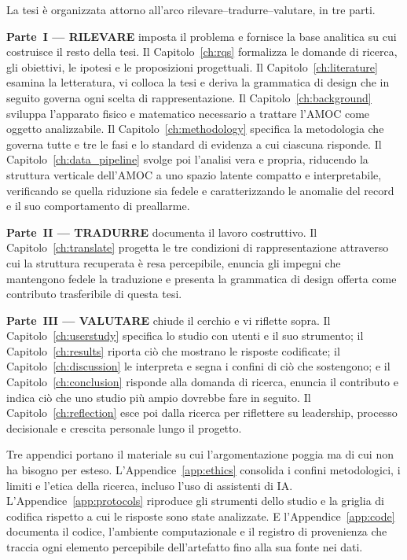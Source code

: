La tesi è organizzata attorno all'arco rilevare--tradurre--valutare, in tre parti.

\textbf{Parte~I --- RILEVARE} imposta il problema e fornisce la base analitica su cui costruisce il resto della tesi. Il Capitolo~\ref{ch:rqs} formalizza le domande di ricerca, gli obiettivi, le ipotesi e le proposizioni progettuali. Il Capitolo~\ref{ch:literature} esamina la letteratura, vi colloca la tesi e deriva la grammatica di design che in seguito governa ogni scelta di rappresentazione. Il Capitolo~\ref{ch:background} sviluppa l'apparato fisico e matematico necessario a trattare l'AMOC come oggetto analizzabile. Il Capitolo~\ref{ch:methodology} specifica la metodologia che governa tutte e tre le fasi e lo standard di evidenza a cui ciascuna risponde. Il Capitolo~\ref{ch:data_pipeline} svolge poi l'analisi vera e propria, riducendo la struttura verticale dell'AMOC a uno spazio latente compatto e interpretabile, verificando se quella riduzione sia fedele e caratterizzando le anomalie del record e il suo comportamento di preallarme.

\textbf{Parte~II --- TRADURRE} documenta il lavoro costruttivo. Il Capitolo~\ref{ch:translate} progetta le tre condizioni di rappresentazione attraverso cui la struttura recuperata è resa percepibile, enuncia gli impegni che mantengono fedele la traduzione e presenta la grammatica di design offerta come contributo trasferibile di questa tesi.

\textbf{Parte~III --- VALUTARE} chiude il cerchio e vi riflette sopra. Il Capitolo~\ref{ch:userstudy} specifica lo studio con utenti e il suo strumento; il Capitolo~\ref{ch:results} riporta ciò che mostrano le risposte codificate; il Capitolo~\ref{ch:discussion} le interpreta e segna i confini di ciò che sostengono; e il Capitolo~\ref{ch:conclusion} risponde alla domanda di ricerca, enuncia il contributo e indica ciò che uno studio più ampio dovrebbe fare in seguito. Il Capitolo~\ref{ch:reflection} esce poi dalla ricerca per riflettere su leadership, processo decisionale e crescita personale lungo il progetto.

Tre appendici portano il materiale su cui l'argomentazione poggia ma di cui non ha bisogno per esteso. L'Appendice~\ref{app:ethics} consolida i confini metodologici, i limiti e l'etica della ricerca, incluso l'uso di assistenti di IA. L'Appendice~\ref{app:protocols} riproduce gli strumenti dello studio e la griglia di codifica rispetto a cui le risposte sono state analizzate. E l'Appendice~\ref{app:code} documenta il codice, l'ambiente computazionale e il registro di provenienza che traccia ogni elemento percepibile dell'artefatto fino alla sua fonte nei dati.
